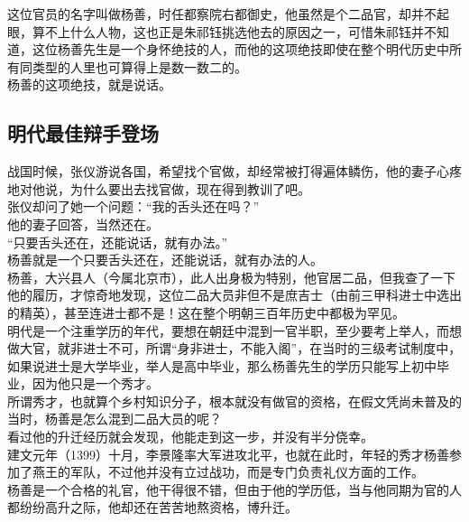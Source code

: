 \begin{multicols}{\theparacolNo}
这位官员的名字叫做杨善，时任都察院右都御史，他虽然是个二品官，却并不起眼，算不上什么人物，这也正是朱祁钰挑选他去的原因之一，可惜朱祁钰并不知道，这位杨善先生是一个身怀绝技的人，而他的这项绝技即使在整个明代历史中所有同类型的人里也可算得上是数一数二的。\\

杨善的这项绝技，就是说话。\\

\subsection{明代最佳辩手登场}
战国时候，张仪游说各国，希望找个官做，却经常被打得遍体鳞伤，他的妻子心疼地对他说，为什么要出去找官做，现在得到教训了吧。\\

张仪却问了她一个问题：“我的舌头还在吗？”\\

他的妻子回答，当然还在。\\

“只要舌头还在，还能说话，就有办法。”\\

杨善就是一个只要舌头还在，还能说话，就有办法的人。\\

杨善，大兴县人（今属北京市），此人出身极为特别，他官居二品，但我查了一下他的履历，才惊奇地发现，这位二品大员非但不是庶吉士（由前三甲科进士中选出的精英），甚至连进士都不是！这在整个明朝三百年历史中都极为罕见。\\

明代是一个注重学历的年代，要想在朝廷中混到一官半职，至少要考上举人，而想做大官，就非进士不可，所谓“身非进士，不能入阁”，在当时的三级考试制度中，如果说进士是大学毕业，举人是高中毕业，那么杨善先生的学历只能写上初中毕业，因为他只是一个秀才。\\

所谓秀才，也就算个乡村知识分子，根本就没有做官的资格，在假文凭尚未普及的当时，杨善是怎么混到二品大员的呢？\\

看过他的升迁经历就会发现，他能走到这一步，并没有半分侥幸。\\

建文元年（1399）十月，李景隆率大军进攻北平，也就在此时，年轻的秀才杨善参加了燕王的军队，不过他并没有立过战功，而是专门负责礼仪方面的工作。\\

杨善是一个合格的礼官，他干得很不错，但由于他的学历低，当与他同期为官的人都纷纷高升之际，他却还在苦苦地熬资格，博升迁。\\


\end{multicols}
